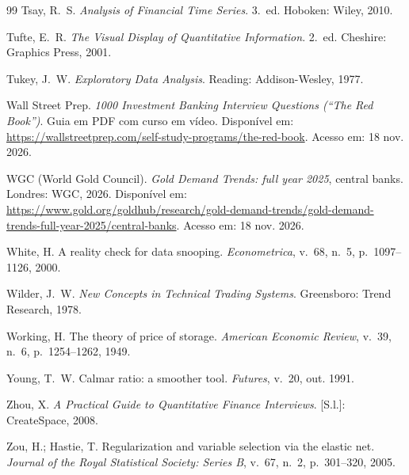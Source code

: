 \begin{thebibliography}{99}
Tsay, R.~S. \emph{Analysis of Financial Time Series}. 3.~ed. Hoboken: Wiley, 2010.

Tufte, E.~R. \emph{The Visual Display of Quantitative Information}. 2.~ed. Cheshire: Graphics Press, 2001.

Tukey, J.~W. \emph{Exploratory Data Analysis}. Reading: Addison-Wesley, 1977.

Wall Street Prep. \emph{1000 Investment Banking Interview Questions (``The Red Book'')}. Guia em PDF com curso em vídeo. Disponível em: \url{https://wallstreetprep.com/self-study-programs/the-red-book}. Acesso em: 18 nov. 2026.

WGC (World Gold Council). \emph{Gold Demand Trends: full year 2025}, central banks. Londres: WGC, 2026. Disponível em: \url{https://www.gold.org/goldhub/research/gold-demand-trends/gold-demand-trends-full-year-2025/central-banks}. Acesso em: 18 nov. 2026.

White, H. A reality check for data snooping. \emph{Econometrica}, v.~68, n.~5, p.~1097--1126, 2000.

Wilder, J.~W. \emph{New Concepts in Technical Trading Systems}. Greensboro: Trend Research, 1978.

Working, H. The theory of price of storage. \emph{American Economic Review}, v.~39, n.~6, p.~1254--1262, 1949.

Young, T.~W. Calmar ratio: a smoother tool. \emph{Futures}, v.~20, out. 1991.

Zhou, X. \emph{A Practical Guide to Quantitative Finance Interviews}. [S.l.]: CreateSpace, 2008.

Zou, H.; Hastie, T. Regularization and variable selection via the elastic net. \emph{Journal of the Royal Statistical Society: Series B}, v.~67, n.~2, p.~301--320, 2005.

\end{thebibliography}
